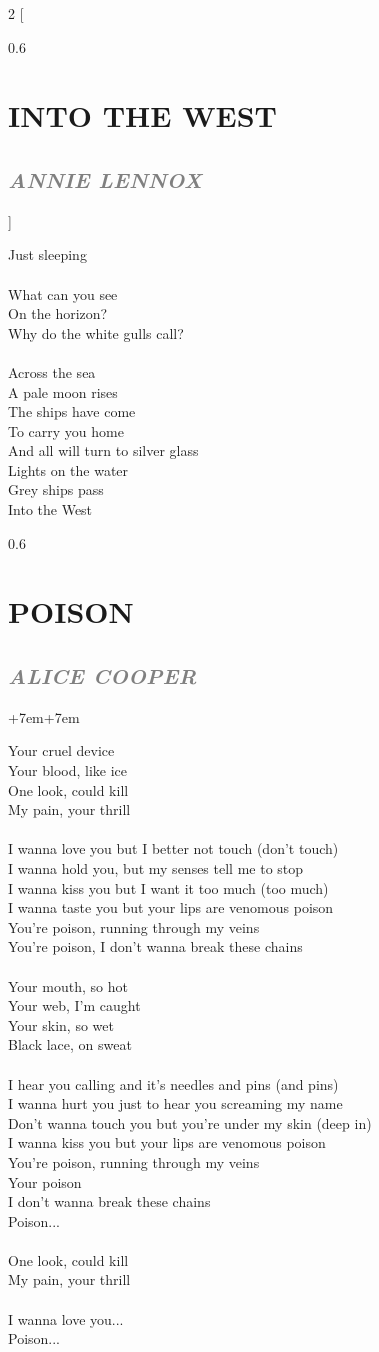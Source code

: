 \documentclass[100pt,a4paper]{report}
\newenvironment{song2}[2]
	{	
    	\begin{multicols*}{2}
		[
			\begin{spacing}{0.6}
				\section*{\LARGE\centering \MakeUppercase{\textbf{{#1}}}}
				\subsection*{\Large\centering \textit{\textcolor{gray}{\MakeUppercase{{#2}}}}}
			\end{spacing}
		]
		\Large
	}
	{
	\end{multicols*}
	\newpage
    }
\newenvironment{song1}[3]
	{
			\begin{spacing}{0.6}
				\section*{\LARGE\centering \MakeUppercase{\textbf{{#1}}}}
				\subsection*{\Large\centering \textit{\textcolor{gray}{\MakeUppercase{{#2}}}}}
			\end{spacing}
			\vspace{0.8cm}
			\begin{adjustwidth}{+7em}{+7em}
			\Large
			
	}
	{
		\end{adjustwidth}
		\newpage
    }
\begin{document}
\begin{song2}{Into the West}{Annie Lennox}
Just sleeping\\
\\
What can you see\\
On the horizon?\\
Why do the white gulls call?\\
\\
Across the sea\\
A pale moon rises\\
The ships have come\\
To carry you home\\
And all will turn to silver glass\\
Lights on the water\\
Grey ships pass\\
Into the West
\end{song2}

\begin{song1}{Poison}{Alice Cooper}
\noindent
Your cruel device\\
Your blood, like ice\\
One look, could kill\\
My pain, your thrill\\
\\
I wanna love you but I better not touch (don’t touch)\\
I wanna hold you, but my senses tell me to stop\\
I wanna kiss you but I want it too much (too much)\\
I wanna taste you but your lips are venomous poison\\
You’re poison, running through my veins\\
You're poison, I don’t wanna break these chains\\
\\
Your mouth, so hot\\
Your web, I’m caught\\
Your skin, so wet\\
Black lace, on sweat\\
\\
I hear you calling and it’s needles and pins (and pins)\\
I wanna hurt you just to hear you screaming my name\\
Don’t wanna touch you but you’re under my skin (deep in)\\
I wanna kiss you but your lips are venomous poison\\
You’re poison, running through my veins\\
Your poison\\
I don’t wanna break these chains\\
Poison...\\
\\
One look, could kill\\
My pain, your thrill\\
\\
I wanna love you...\\
Poison...
\end{song1}
\end{document}
